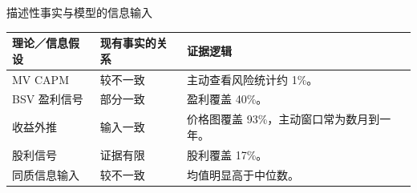 \begin{frame}[label=averages]{描述性事实与模型的信息输入}
  \small
  \setlength{\tabcolsep}{3pt}
  \renewcommand{\arraystretch}{1.10}
  \begin{tabularx}{\linewidth}{@{}L{.26\linewidth}L{.18\linewidth}Y@{}}
    \toprule 理论／信息假设 & 现有事实的关系 & 证据逻辑\\\midrule
    MV CAPM & 较不一致 & 主动查看风险统计约 1\%。\\
    BSV 盈利信号 & 部分一致 & 盈利覆盖 40\%。\\
    收益外推 & 输入一致 & 价格图覆盖 93\%，主动窗口常为数月到一年。\\
    股利信号 & 证据有限 & 股利覆盖 17\%。\\
    同质信息输入 & 较不一致 & 均值明显高于中位数。\\
    \bottomrule
  \end{tabularx}
\end{frame}
